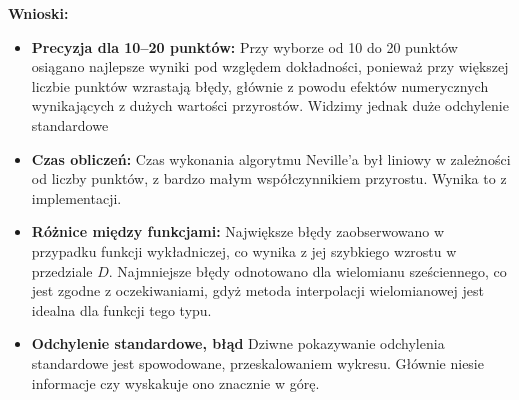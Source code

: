 \textbf{Wnioski:}
\begin{itemize}
    \item \textbf{Precyzja dla 10–20 punktów:} Przy wyborze od 10 do 20 punktów osiągano najlepsze wyniki pod względem dokładności, ponieważ przy większej liczbie punktów wzrastają błędy, głównie z powodu efektów numerycznych wynikających z dużych wartości przyrostów. Widzimy jednak duże odchylenie standardowe 
    \item \textbf{Czas obliczeń:} Czas wykonania algorytmu Neville'a był liniowy w zależności od liczby punktów, z bardzo małym współczynnikiem przyrostu. Wynika to z implementacji.
    \item \textbf{Różnice między funkcjami:} Największe błędy zaobserwowano w przypadku funkcji wykładniczej, co wynika z jej szybkiego wzrostu w przedziale \( D \). Najmniejsze błędy odnotowano dla wielomianu sześciennego, co jest zgodne z oczekiwaniami, gdyż metoda interpolacji wielomianowej jest idealna dla funkcji tego typu.
    \item \textbf{Odchylenie standardowe, błąd} Dziwne pokazywanie odchylenia standardowe jest spowodowane, przeskalowaniem wykresu. Głównie niesie informacje czy wyskakuje ono znacznie w górę. 
\end{itemize}
